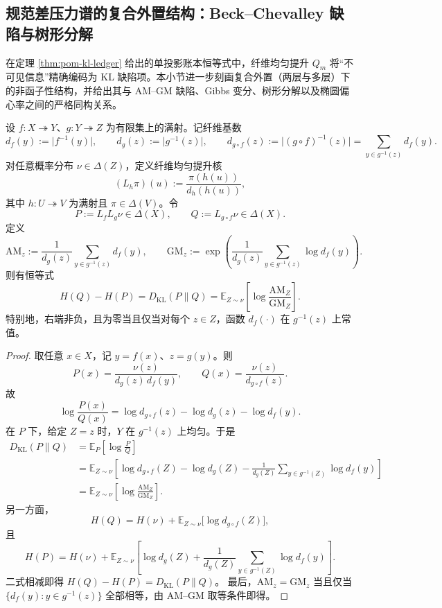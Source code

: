 \subsection{规范差压力谱的复合外置结构：Beck--Chevalley 缺陷与树形分解}\label{subsec:pom-bc-gauge-anomaly-pressure}
在定理 \ref{thm:pom-kl-ledger} 给出的单投影账本恒等式中，纤维均匀提升 \(Q_m\) 将“不可见信息”精确编码为 KL 缺陷项。本小节进一步刻画复合外置（两层与多层）下的非函子性结构，并给出其与 AM--GM 缺陷、Gibbs 变分、树形分解以及椭圆偏心率之间的严格同构关系。

\begin{theorem}\label{thm:pom-bc-amgm-defect-identity}
设 \(f:X\twoheadrightarrow Y\)、\(g:Y\twoheadrightarrow Z\) 为有限集上的满射。记纤维基数
\[
d_f(y):=\lvert f^{-1}(y)\rvert,\qquad
d_g(z):=\lvert g^{-1}(z)\rvert,\qquad
d_{g\circ f}(z):=\lvert(g\circ f)^{-1}(z)\rvert=\sum_{y\in g^{-1}(z)}d_f(y).
\]
对任意概率分布 \(\nu\in\Delta(Z)\)，定义纤维均匀提升核
\[
(L_h\pi)(u):=\frac{\pi(h(u))}{d_h(h(u))},
\]
其中 \(h:U\twoheadrightarrow V\) 为满射且 \(\pi\in\Delta(V)\)。令
\[
P:=L_fL_g\nu\in\Delta(X),\qquad
Q:=L_{g\circ f}\nu\in\Delta(X).
\]
定义
\[
\mathrm{AM}_z:=\frac{1}{d_g(z)}\sum_{y\in g^{-1}(z)}d_f(y),\qquad
\mathrm{GM}_z:=\exp\!\left(\frac{1}{d_g(z)}\sum_{y\in g^{-1}(z)}\log d_f(y)\right).
\]
则有恒等式
\[
\boxed{\;
H(Q)-H(P)=D_{\mathrm{KL}}(P\|Q)
=\mathbb E_{Z\sim\nu}\!\left[\log\frac{\mathrm{AM}_Z}{\mathrm{GM}_Z}\right].
\;}
\]
特别地，右端非负，且为零当且仅当对每个 \(z\in Z\)，函数 \(d_f(\cdot)\) 在 \(g^{-1}(z)\) 上常值。
\end{theorem}
\begin{proof}
取任意 \(x\in X\)，记 \(y=f(x)\)、\(z=g(y)\)。则
\[
P(x)=\frac{\nu(z)}{d_g(z)\,d_f(y)},\qquad
Q(x)=\frac{\nu(z)}{d_{g\circ f}(z)}.
\]
故
\[
\log\frac{P(x)}{Q(x)}
=\log d_{g\circ f}(z)-\log d_g(z)-\log d_f(y).
\]
在 \(P\) 下，给定 \(Z=z\) 时，\(Y\) 在 \(g^{-1}(z)\) 上均匀。于是
\[
\begin{aligned}
D_{\mathrm{KL}}(P\|Q)
&=\mathbb E_{P}\!\left[\log\frac{P}{Q}\right]\\
&=\mathbb E_{Z\sim\nu}\!\left[
\log d_{g\circ f}(Z)-\log d_g(Z)
-\frac1{d_g(Z)}\sum_{y\in g^{-1}(Z)}\log d_f(y)
\right]\\
&=\mathbb E_{Z\sim\nu}\!\left[\log\frac{\mathrm{AM}_Z}{\mathrm{GM}_Z}\right].
\end{aligned}
\]
另一方面，
\[
H(Q)=H(\nu)+\mathbb E_{Z\sim\nu}\!\big[\log d_{g\circ f}(Z)\big],
\]
且
\[
H(P)=H(\nu)+\mathbb E_{Z\sim\nu}\!\left[
\log d_g(Z)+\frac1{d_g(Z)}\sum_{y\in g^{-1}(Z)}\log d_f(y)\right].
\]
二式相减即得 \(H(Q)-H(P)=D_{\mathrm{KL}}(P\|Q)\)。
最后，\(\mathrm{AM}_z=\mathrm{GM}_z\) 当且仅当 \(\{d_f(y):y\in g^{-1}(z)\}\) 全部相等，由 AM--GM 取等条件即得。
\end{proof}

